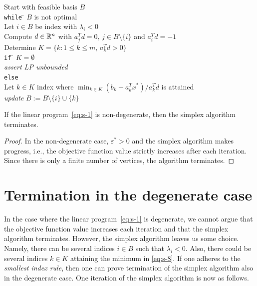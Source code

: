 \begin{algorithm}
 \begin{tabbing}
      Start with feasible basis $B$ \\[1ex]
      {\tt while} \= $B$ is not optimal \\ [.7ex]
      \> Let $i \in B$ be index with $\lambda_i<0$ \\
      \> Compute  $d \in \mathbb{R}^n$ with $a_j^T d = 0, \, j \in B \setminus\{i\}$
      and $a_i^T d = -1$ \\ 
      \> Determine $K = \{ k \colon 1 \leq k \leq m, \, a_k^Td >0\}$\\[.7ex]  
      \> {\tt if} \= $K = \emptyset$ \\   
      \> \> \emph{assert LP unbounded} \\
      \> {\tt else} \\
      \> \> Let $k \in K$ index where 
     $
        \displaystyle \min_{k \in K} (b_k - a_k^Tx^*)/a_k^Td
      $
      is attained \\ %

      \> \>\emph{update} $B := B \setminus\{i\} \cup \{k\}$             
    \end{tabbing}
    
  \end{algorithm}
  


  \begin{theorem}
    \label{thr:s-5}
    If the linear program~\eqref{eq:s-1} is non-degenerate, then the simplex algorithm terminates. 
  \end{theorem}

  \begin{proof}
    In the non-degenerate case, $\varepsilon^*>0$ and the simplex
    algorithm makes progress, i.e., the objective function value
    strictly increases after each iteration. Since there is only a
    finite number of vertices, the algorithm terminates.
  \end{proof}

  
\section{Termination in the degenerate case}
\label{sec:term-degen-case}


In the case where the linear program~\eqref{eq:s-1} is degenerate, we cannot argue that the objective function value increases each iteration and that the simplex algorithm terminates. However, the simplex algorithm leaves us some choice. Namely, there can be several indices $i \in B$ such that $\lambda_i<0$. Also, there could be several indices $k \in K$ attaining the minimum in \eqref{eq:s-8}. If one adheres to the  \emph{smallest index rule}, then one can prove termination of the simplex algorithm also in the degenerate case. One iteration of the simplex algorithm is now as follows. 



